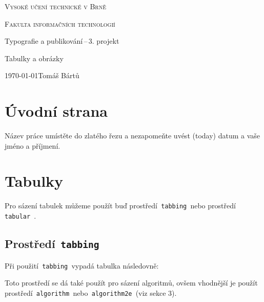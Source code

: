 \documentclass[a4paper,11pt]{article}[20-03-2022]
\begin{document}
\color{green}
\begin{titlepage}
    \begin{center}
        \Huge \textsc{Vysoké učení technické v Brně}

        \huge \textsc{Fakulta informačních technologií}


        \LARGE Typografie a publikování\,--\,3. projekt

        \Huge Tabulky a obrázky

    \end{center}
    {\Large \today \hfill Tomáš Bártů}    
\end{titlepage}

\section{Úvodní strana}
Název práce umístěte do zlatého řezu a nezapomeňte uvést     (today) datum a vaše jméno a příjmení.

\section{Tabulky}
Pro sázení tabulek můžeme použít buď prostředí\texttt{ tabbing }nebo prostředí\texttt{ tabular }.

\subsection{Prostředí\texttt{ tabbing }}
Při použití\texttt{ tabbing }vypadá tabulka následovně:
\begin{tabbing}
    
\end{tabbing}
Toto prostředí se dá také použít pro sázení algoritmů, ovšem vhodnější je použít prostředí\texttt{ algorithm }nebo\texttt{ algorithm2e }(viz sekce 3).
\end{document}
